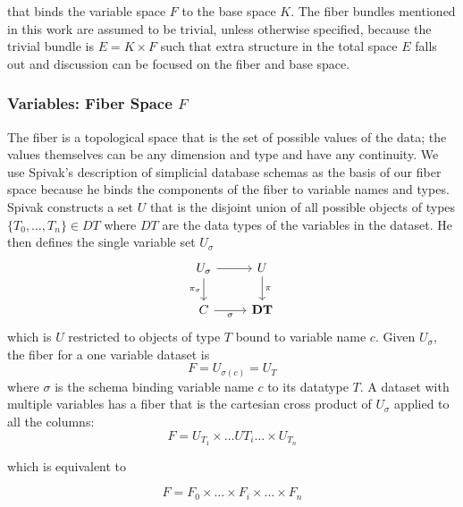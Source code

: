 \documentclass[../main.tex]{subfiles}
\begin{document}
that binds the variable space $F$ to the base space $K$. The fiber bundles mentioned in this work are assumed to be trivial\cite{spanier1989algebraic,LocallyTrivialFibre}, unless otherwise specified, because the trivial bundle is $E=K\times F$ such that extra structure in the total space $E$ falls out and discussion can be focused on the fiber and base space. 

\subsubsection{Variables: Fiber Space $F$}
\label{sec:data_fiber}
The fiber is a topological space that is the set of possible values of the data; the values themselves can be any dimension and type and have any continuity. We use Spivak's description of simplicial database schemas \cite{spivakSIMPLICIALDATABASES} as the basis of our fiber space because he binds the components of the fiber to variable names and types. Spivak constructs a set $U$ that is the disjoint union of all possible objects of types $\{T_0, \ldots, T_n\} \in DT$ where $DT$ are the data types of the variables in the dataset. He then defines the single variable set $U_\sigma$ 
\begin{equation}
    \label{eq:data_types}
\begin{tikzcd}
    U_{\sigma} \arrow[r] \arrow[d, "\pi_{\sigma}"'] & U \arrow[d, "\pi"] \\
    C \arrow[r, "\sigma"']                          & \textbf{DT}       
\end{tikzcd}
\end{equation}
which is $U$ restricted to objects of type $T$ bound to variable name $c$. Given $U_{\sigma}$, the fiber for a one variable dataset is
\begin{equation}
    F = U_{\sigma(c)} = U_{T} 
\end{equation}
where $\sigma$ is the schema binding variable name $c$ to its datatype $T$. A dataset with multiple variables has a fiber that is the cartesian cross product of $U_{\sigma}$ applied to all the columns:
\begin{equation}
F = U_{T_1}\times \ldots U{T_i} \ldots\times U_{T_n}
\end{equation}

which is equivalent to 

\begin{equation}
    F= F_{0} \times \ldots \times F_{i}\times\ldots\times F_{n}
\end{equation}
\end{document}
